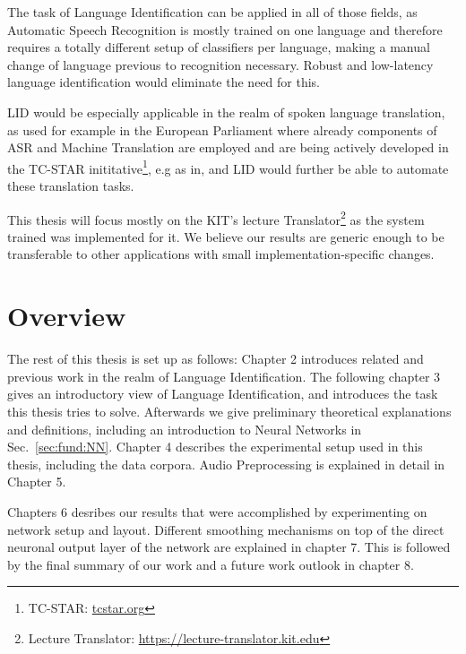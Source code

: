 The task of Language Identification can be applied in all of those fields, as Automatic Speech Recognition is mostly trained on one language and therefore requires a totally different setup of classifiers per language, making a manual change of language previous to recognition necessary. Robust and low-latency language identification would eliminate the need for this.

LID would be especially applicable in the realm of spoken language translation, as used for example in the European Parliament where already components of ASR and Machine Translation are employed and are being actively developed in the TC-STAR inititative\footnote{TC-STAR: \url{tcstar.org}}, e.g as in\cite{vilar2005statistical}, and LID would further be able to automate these translation tasks.

This thesis will focus mostly on the KIT's lecture Translator\footnote{Lecture Translator: \url{https://lecture-translator.kit.edu}}  as the system trained was implemented for it. We believe our results are generic enough to be transferable to other applications with small implementation-specific changes.

\section{Overview}
\label{sec:Intro:Overview}

The rest of this thesis is set up as follows: Chapter 2 introduces related and previous work in the realm of Language Identification. The following chapter 3 gives an introductory view of Language Identification, and introduces the task this thesis tries to solve. Afterwards we give preliminary theoretical explanations and definitions, including an introduction to Neural Networks in Sec.~\ref{sec:fund:NN}. Chapter 4 describes the experimental setup used in this thesis, including the data corpora. Audio Preprocessing is explained in detail in Chapter 5.

Chapters 6 desribes our results that were accomplished by experimenting on network setup and layout. Different smoothing mechanisms on top of the direct neuronal output layer of the network are explained in chapter 7. This is followed by the final summary of our work and a future work outlook in chapter 8.